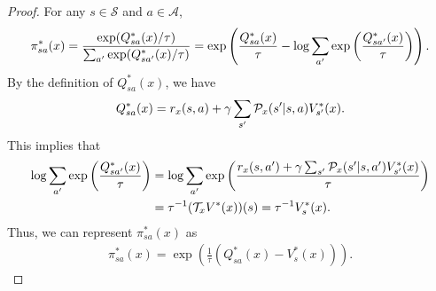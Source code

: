 \documentclass{article}
\theoremstyle{plain}
\theoremstyle{definition}
\theoremstyle{remark}
\def\cA{\mathcal A}
\def\cP{\mathcal P}
\def\cS{\mathcal S}
\def\cT{\mathcal T}
\begin{document}
\begin{proof}

    For any $s\in\cS$ and $a\in\cA$,
    \begin{align}
        \pi^*_{sa}(x) = \frac{\exp (Q^*_{sa}(x)/\tau)}{\sum_{a'} \exp (Q^*_{sa'}(x)/\tau)} = \exp\left( \frac{Q^*_{sa}(x)}{\tau} - \log \sum_{a'} \exp \left( \frac{Q^*_{sa'}(x)}{\tau} \right) \right) \notag.
    \end{align}
    By the definition of $Q^*_{sa}(x)$, we have
    \begin{align}
        Q^*_{sa}(x) = r_x(s,a) + \gamma \sum_{s^\prime} \cP_x(s^\prime|s,a) V^*_{s^\prime}(x). \notag
    \end{align}
    This implies that 
    \begin{align}
        \log \sum_{a'} \exp \left( \frac{Q^*_{sa'}(x)}{\tau} \right) & = \log \sum_{a'} \exp \left( \frac{r_x(s,a') + \gamma \sum_{s^\prime} \cP_x(s^\prime|s,a') V^*_{s^\prime}(x)}{\tau} \right) \notag\\
        & = \tau^{-1} (\cT_x V^*(x))(s) = \tau^{-1} V^*_s(x).\notag
    \end{align}
    Thus, we can represent $\pi^*_{sa}(x)$ as
    \begin{align}
        \pi^*_{sa}(x) =  \exp\left( \frac{1}{\tau}  \left( Q^*_{sa}(x) - V^*_s(x) \right) \right).
    \end{align}


\end{proof}
\end{document}
